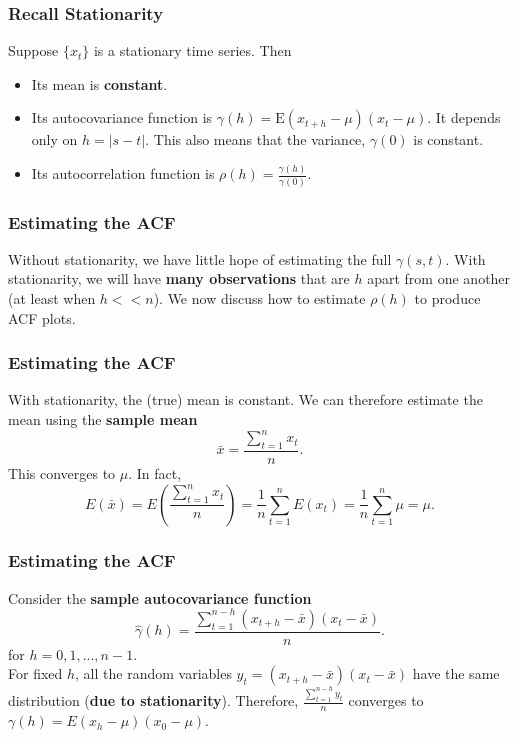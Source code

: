 \documentclass[%
xcolor=pdftex]{beamer}
\begin{document}
\begin{frame}
\frametitle{Recall Stationarity}

Suppose $\{x_t\}$ is a stationary time series. Then

\begin{itemize}
\item Its mean is \textbf{constant}.
\item Its autocovariance function is $\gamma(h)=\mbox{E}(x_{t+h}-\mu)(x_t-\mu)$. It depends only on $h=|s-t|$. This also means that the variance, $\gamma(0)$ is constant.
\item Its autocorrelation function is $\rho(h) =\frac{\gamma(h)}{\gamma(0)}$.
\end{itemize}

\end{frame}

\begin{frame}
\frametitle{Estimating the ACF}

Without stationarity, we have little
hope of estimating the full $\gamma(s,t)$.  With stationarity,
we will have \textbf{many observations} that are $h$ apart from one
another (at least when $h<<n$).  We now discuss how to
estimate $\rho(h)$ to produce ACF plots.

\end{frame}

\begin{frame}
\frametitle{Estimating the ACF}

With stationarity, the (true) mean is constant.  We can therefore estimate the mean using the \textbf{sample mean}
$$
\bar{x}=\frac{\sum_{t=1}^n x_t}{n}.
$$
This converges to $\mu$. In fact,
$$
E(\bar{x}) = E (\frac{\sum^n_{t=1}x_t}{n}) = \frac{1}{n} \sum^n_{t=1} E(x_t)  =\frac{1}{n} \sum^n_{t=1} \mu =\mu.
$$
\end{frame}

\begin{frame}
\frametitle{Estimating the ACF}

Consider the \textbf{sample autocovariance function}
\begin{equation} \label{eq:samp1}
\hat{\gamma}(h)=\frac{\sum_{t=1}^{n-h} (x_{t+h}-\bar{x})(x_{t}-\bar{x})}{n}.
\end{equation}
for $h=0,1,...,n-1$.  \\
\vspace{5mm}
For fixed $h$, all the random variables $y_t=(x_{t+h}-\bar{x})(x_{t}-\bar{x})$ have the same distribution (\textbf{due to stationarity}).  Therefore, $\frac{\sum_{t=1}^{n-h} y_t}{n}$ converges to $\gamma(h)=E(x_{h}-\mu)(x_{0}-\mu)$.

\end{frame}
\end{document}
